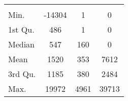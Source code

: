 \begin{tabular}{lS[table-format=5.1]S[table-format=5.1]S[table-format=5.1]}
&  &  &  \\
 Min.    & -14304 & 1 & 0 \\
 1st Qu. & 486 & 1 & 0 \\
 Median  & 547 & 160 & 0 \\
 Mean    & 1520 & 353 & 7612 \\
 3rd Qu. & 1185 & 380 & 2484 \\
 Max.    & 19972 & 4961 & 39713 \\
\end{tabular}
